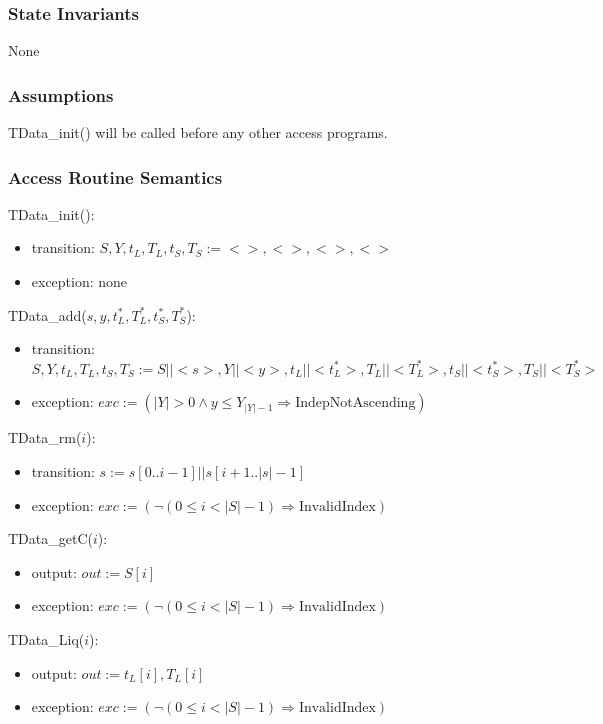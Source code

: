 \documentclass[12pt, titlepage]{article}
\begin{document}
\subsubsection{State Invariants}

None

\subsubsection{Assumptions}

TData\_init() will be called before any other access programs.

\subsubsection{Access Routine Semantics}

TData\_init():
\begin{itemize}
\item transition: $S, Y, t_L, T_L, t_S, T_S  := < >, <>, <>, <>$
\item exception: none
\end{itemize}

\noindent TData\_add($s, y, t^*_L, T^*_L, t^*_S, T^*_S$):
\begin{itemize}
\item transition: $S, Y, t_L, T_L, t_S, T_S  := S || <s>, Y || <y>, t_L ||
  <t^*_L>, T_L|| <T^*_L>, t_S|| <t^*_S>, T_S|| <T^*_S>$
\item exception: $exc := ( |Y| > 0 \wedge y \leq Y_{|Y|-1} \Rightarrow
  \mbox{IndepNotAscending})$
\end{itemize}

\noindent TData\_rm($i$):
\begin{itemize}
\item transition: $s := s[0..i-1] || s[i+1..|s|-1]$
\item exception:  $exc := (\neg(0 \leq i < |S|-1) \Rightarrow \mbox{InvalidIndex})$
\end{itemize}

\noindent TData\_getC($i$):
\begin{itemize}
\item output: $out := S[i]$
\item exception: $exc := (\neg(0 \leq i < |S|-1) \Rightarrow \mbox{InvalidIndex})$
\end{itemize}

\noindent TData\_Liq($i$):
\begin{itemize}
\item output: $out := t_L[i], T_L[i]$
\item exception: $exc := (\neg(0 \leq i < |S|-1) \Rightarrow \mbox{InvalidIndex})$
\end{itemize}
\end{document}
